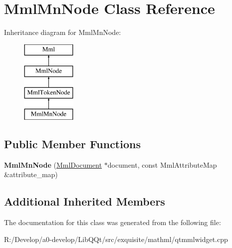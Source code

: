 \hypertarget{class_mml_mn_node}{}\section{Mml\+Mn\+Node Class Reference}
\label{class_mml_mn_node}
Inheritance diagram for Mml\+Mn\+Node\+:\begin{figure}[H]
\begin{center}
\leavevmode
\includegraphics[height=4.000000cm]{class_mml_mn_node}
\end{center}
\end{figure}
\subsection*{Public Member Functions}
\begin{DoxyCompactItemize}
\item 
\mbox{\label{class_mml_mn_node_ac6b31a5ca6002871815f2429b0e37eee}} 
{\bfseries Mml\+Mn\+Node} (\mbox{\hyperlink{class_mml_document}{Mml\+Document}} $\ast$document, const Mml\+Attribute\+Map \&attribute\+\_\+map)
\end{DoxyCompactItemize}
\subsection*{Additional Inherited Members}


The documentation for this class was generated from the following file\+:\begin{DoxyCompactItemize}
\item 
R\+:/\+Develop/a0-\/develop/\+Lib\+Q\+Qt/src/exquisite/mathml/qtmmlwidget.\+cpp\end{DoxyCompactItemize}
